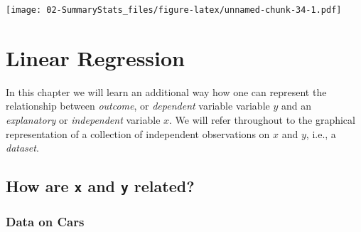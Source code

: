 \documentclass[]{book}
\newenvironment{Shaded}{\begin{snugshade}}{\end{snugshade}}
\newcommand{\KeywordTok}[1]{\textcolor[rgb]{0.13,0.29,0.53}{\textbf{#1}}}
\newcommand{\DataTypeTok}[1]{\textcolor[rgb]{0.13,0.29,0.53}{#1}}
\newcommand{\DecValTok}[1]{\textcolor[rgb]{0.00,0.00,0.81}{#1}}
\newcommand{\StringTok}[1]{\textcolor[rgb]{0.31,0.60,0.02}{#1}}
\newcommand{\CommentTok}[1]{\textcolor[rgb]{0.56,0.35,0.01}{\textit{#1}}}
\newcommand{\OperatorTok}[1]{\textcolor[rgb]{0.81,0.36,0.00}{\textbf{#1}}}
\newcommand{\NormalTok}[1]{#1}
\begin{document}
\begin{Shaded}
\end{Shaded}

\texttt{[image: 02-SummaryStats\_files/figure-latex/unnamed-chunk-34-1.pdf]}

\chapter{Linear Regression}\label{linreg}

In this chapter we will learn an additional way how one can represent
the relationship between \emph{outcome}, or \emph{dependent} variable
variable \(y\) and an \emph{explanatory} or \emph{independent} variable
\(x\). We will refer throughout to the graphical representation of a
collection of independent observations on \(x\) and \(y\), i.e., a
\emph{dataset}.

\section{\texorpdfstring{How are \texttt{x} and \texttt{y}
related?}{How are x and y related?}}\label{how-are-x-and-y-related}

\subsection{Data on Cars}\label{data-on-cars}
\end{document}
